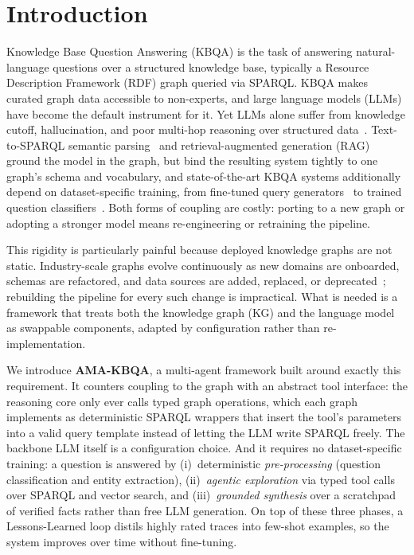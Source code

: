 \documentclass[sigconf,natbib=true]{ceurart}
\begin{document}
\section{Introduction}
Knowledge Base Question Answering (KBQA) is the task of answering
natural-language questions over a structured knowledge base, typically
a Resource Description Framework (RDF) graph queried via SPARQL. KBQA
makes curated graph data accessible to non-experts, and large language
models (LLMs) have become the default instrument for it. Yet LLMs alone suffer from knowledge cutoff,
hallucination, and poor multi-hop reasoning over structured
data~\cite{agrawal2023kg}. Text-to-SPARQL
semantic parsing~\cite{berant2013semantic} and retrieval-augmented
generation (RAG)~\cite{lewis2020retrieval} ground the model in the
graph, but bind the resulting system tightly to one graph's schema and
vocabulary, and state-of-the-art KBQA systems additionally depend on
dataset-specific training, from fine-tuned query
generators~\cite{rony2022sgpt} to trained question
classifiers~\cite{xiong-etal-2024-interactive}. Both forms of coupling
are costly: porting to a new graph or adopting a stronger model means
re-engineering or retraining the pipeline.

This rigidity is particularly painful because deployed knowledge
graphs are not static. Industry-scale graphs evolve continuously as
new domains are onboarded, schemas are refactored, and data sources
are added, replaced, or deprecated~\cite{noy2019industry}; rebuilding
the pipeline for every such change is impractical. What is needed is a
framework that treats both the knowledge graph (KG) and the language
model as swappable components, adapted by configuration rather than
re-implementation.

We introduce \textbf{AMA-KBQA}, a multi-agent framework built around
exactly this requirement. It counters coupling to the graph with an
abstract tool interface: the reasoning core only ever calls typed
graph operations, which each graph implements as deterministic SPARQL
wrappers that insert the tool's parameters into a valid query template
instead of letting the LLM write SPARQL freely. The backbone LLM
itself is a configuration choice. And it requires no dataset-specific
training: a question is answered
by (i)~deterministic \emph{pre-processing} (question classification
and entity extraction), (ii)~\emph{agentic exploration} via typed tool
calls over SPARQL and vector search, and (iii)~\emph{grounded
synthesis} over a scratchpad of verified facts rather than free LLM
generation. On top of these three phases, a Lessons-Learned loop
distils highly rated traces into few-shot examples, so the system
improves over time without fine-tuning.
\end{document}
